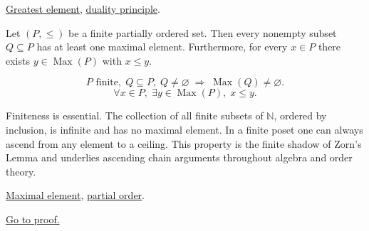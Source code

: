 \begin{remark*}[Dependencies]
\hyperref[def:greatest-element]{Greatest element},
\hyperref[prop:duality-principle]{duality principle}.
\end{remark*}


\begin{proposition}
\label{prop:finite-poset-maximal}
Let $(P, \leq)$ be a finite partially ordered set.  Then every nonempty
subset $Q \subseteq P$ has at least one maximal element.  Furthermore,
for every $x \in P$ there exists $y \in \operatorname{Max}(P)$ with
$x \leq y$.
\end{proposition}

\begin{remark*}
\[
P \text{ finite},\; Q \subseteq P,\; Q \neq \varnothing
\;\Longrightarrow\;
\operatorname{Max}(Q) \neq \varnothing.
\]
\[
\forall x \in P,\; \exists y \in \operatorname{Max}(P),\; x \leq y.
\]
\end{remark*}

\begin{remark*}[Interpretation]
Finiteness is essential.  The collection of all finite subsets of
$\mathbb{N}$, ordered by inclusion, is infinite and has no maximal
element.  In a finite poset one can always ascend from any element to
a ceiling.  This property is the finite shadow of Zorn's Lemma and
underlies ascending chain arguments throughout algebra and order theory.
\end{remark*}

\begin{remark*}[Dependencies]
\hyperref[def:maximal-element]{Maximal element},
\hyperref[def:lattice-order-partial-order]{partial order}.
\end{remark*}

\begin{remark*}[Proof]
\hyperref[prf:finite-poset-maximal]{Go to proof.}
\end{remark*}
